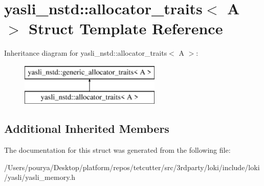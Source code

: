 \hypertarget{structyasli__nstd_1_1allocator__traits}{}\section{yasli\+\_\+nstd\+:\+:allocator\+\_\+traits$<$ A $>$ Struct Template Reference}
\label{structyasli__nstd_1_1allocator__traits}
Inheritance diagram for yasli\+\_\+nstd\+:\+:allocator\+\_\+traits$<$ A $>$\+:\begin{figure}[H]
\begin{center}
\leavevmode
\includegraphics[height=2.000000cm]{structyasli__nstd_1_1allocator__traits}
\end{center}
\end{figure}
\subsection*{Additional Inherited Members}


The documentation for this struct was generated from the following file\+:\begin{DoxyCompactItemize}
\item 
/\+Users/pourya/\+Desktop/platform/repos/tetcutter/src/3rdparty/loki/include/loki/yasli/yasli\+\_\+memory.\+h\end{DoxyCompactItemize}
